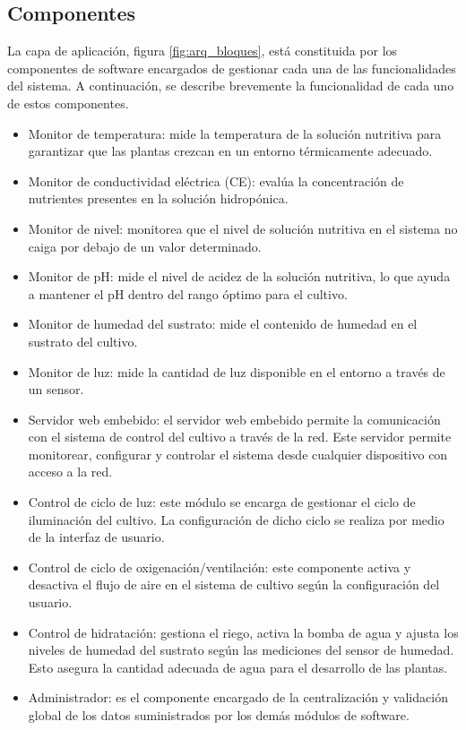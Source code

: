 \subsection{Componentes}

La capa de aplicación, figura \ref{fig:arq_bloques}, está constituida por los componentes de software encargados de gestionar cada una de las funcionalidades del sistema.
A continuación, se describe brevemente la funcionalidad de cada uno de estos componentes.

\begin{itemize}
	\item Monitor de temperatura: mide la temperatura de la solución nutritiva para garantizar que las plantas crezcan en un entorno térmicamente adecuado.
	\item Monitor de conductividad eléctrica (CE): evalúa la concentración de nutrientes presentes en la solución hidropónica.
	\item Monitor de nivel: monitorea que el nivel de solución nutritiva en el sistema no caiga por debajo de un valor determinado.
	\item Monitor de pH: mide el nivel de acidez de la solución nutritiva, lo que ayuda a mantener el pH dentro del rango óptimo para el cultivo.
	\item Monitor de humedad del sustrato: mide el contenido de humedad en el sustrato del cultivo.
	\item Monitor de luz: mide la cantidad de luz disponible en el entorno a través de un sensor.
	\item Servidor web embebido: el servidor web embebido permite la comunicación con el sistema de control del cultivo a través de la red. Este servidor permite monitorear, configurar y controlar el sistema desde cualquier dispositivo con acceso a la red.
	\item Control de ciclo de luz: este módulo se encarga de gestionar el ciclo de iluminación del cultivo. La configuración de dicho ciclo se realiza por medio de la interfaz de usuario.
	\item Control de ciclo de oxigenación/ventilación: este componente activa y desactiva el flujo de aire en el sistema de cultivo según la configuración del usuario.
	\item Control de hidratación: gestiona el riego, activa la bomba de agua y ajusta los niveles de humedad del sustrato según las mediciones del sensor de humedad. Esto asegura la cantidad adecuada de agua para el desarrollo de las plantas.
	\item Administrador: es el componente encargado de la centralización y validación global de los datos suministrados por los demás módulos de software.
\end{itemize}



